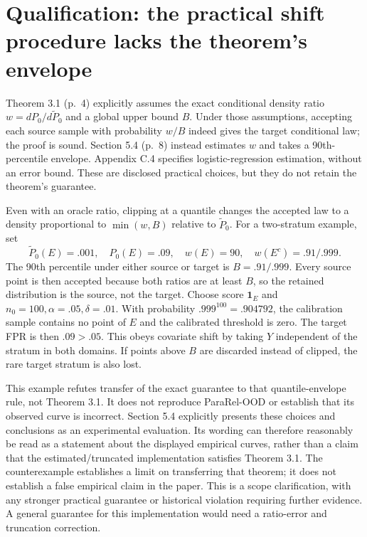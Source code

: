 \documentclass[10pt]{article}
\begin{document}
\section*{Qualification: the practical shift procedure lacks the theorem’s envelope}
Theorem 3.1 (p. 4) explicitly assumes the exact conditional density ratio \(w=dP_0/d\widetilde P_0\) and a global upper bound \(B\). Under those assumptions, accepting each source sample with probability \(w/B\) indeed gives the target conditional law; the proof is sound. Section 5.4 (p. 8) instead estimates \(w\) and takes a 90th-percentile envelope. Appendix C.4 specifies logistic-regression estimation, without an error bound. These are disclosed practical choices, but they do not retain the theorem’s guarantee.\par
Even with an oracle ratio, clipping at a quantile changes the accepted law to a density proportional to \(\min(w,B)\) relative to \(\widetilde P_0\). For a two-stratum example, set \[\widetilde P_0(E)=.001,\quad P_0(E)=.09,\quad
 w(E)=90,\quad w(E^c)=.91/.999.\] The 90th percentile under either source or target is \(B=.91/.999\). Every source point is then accepted because both ratios are at least \(B\), so the retained distribution is the source, not the target. Choose score \(\mathbf1_E\) and \(n_0=100,\alpha=.05,\delta=.01\). With probability \(.999^{100}=.904792\), the calibration sample contains no point of \(E\) and the calibrated threshold is zero. The target FPR is then \(.09>.05\). This obeys covariate shift by taking \(Y\) independent of the stratum in both domains. If points above \(B\) are discarded instead of clipped, the rare target stratum is also lost.\par
This example refutes transfer of the exact guarantee to that quantile-envelope rule, not Theorem 3.1. It does not reproduce ParaRel-OOD or establish that its observed curve is incorrect. Section 5.4 explicitly presents these choices and conclusions as an experimental evaluation. Its wording can therefore reasonably be read as a statement about the displayed empirical curves, rather than a claim that the estimated/truncated implementation satisfies Theorem 3.1. The counterexample establishes a limit on transferring that theorem; it does not establish a false empirical claim in the paper. This is a scope clarification, with any stronger practical guarantee or historical violation requiring further evidence. A general guarantee for this implementation would need a ratio-error and truncation correction.\par
\end{document}
